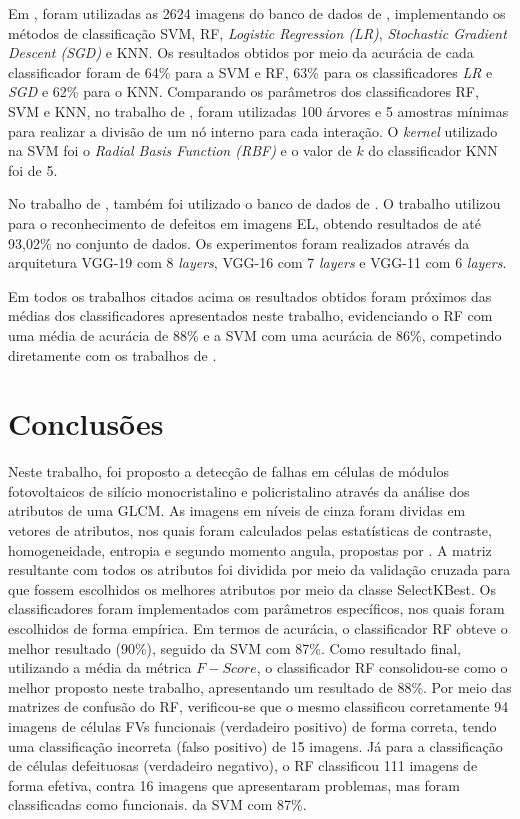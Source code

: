 \documentclass[a4paper]{ifacconf}
\begin{document}
Em \citep{Shin2020}, foram utilizadas as 2624 imagens do banco de dados de \cite{Buerhop2018}, implementando os métodos de classificação SVM, RF, \textit{Logistic Regression (LR)}, \textit{Stochastic Gradient Descent (SGD)} e KNN. Os resultados obtidos por meio da acurácia de cada classificador foram de 64\% para a SVM e RF, 63\% para os classificadores \textit{LR} e \textit{SGD} e 62\% para o KNN. Comparando os parâmetros dos classificadores RF, SVM e KNN, no trabalho de \citep{Shin2020}, foram utilizadas 100 árvores e 5 amostras mínimas para realizar a divisão de um nó interno para cada interação. O \textit{kernel} utilizado na SVM foi o \textit{Radial Basis Function (RBF)} e o valor de $k$ do classificador KNN foi de 5. 

No trabalho de \citep{Akram2019}, também foi utilizado o banco de dados de \citep{Buerhop2018}. O trabalho utilizou para o reconhecimento de defeitos em imagens EL, obtendo resultados de até 93,02\% no conjunto de dados. Os experimentos foram realizados através da arquitetura VGG-19 com 8 \textit{layers}, VGG-16 com 7 \textit{layers} e VGG-11 com 6 \textit{layers}.

Em todos os trabalhos citados acima os resultados obtidos foram próximos das médias dos classificadores apresentados neste trabalho, evidenciando o RF com uma média de acurácia de 88\% e a SVM com uma acurácia de 86\%, competindo diretamente com os trabalhos de \cite{Deitsch2019, Akram2019}. 


\section{Conclusões}
Neste trabalho, foi proposto a detecção de falhas em células de módulos fotovoltaicos de silício monocristalino e policristalino através da análise dos atributos de uma GLCM. As imagens em níveis de cinza foram dividas em vetores de atributos, nos quais
foram calculados pelas estatísticas de contraste, homogeneidade, entropia e segundo momento
angula, propostas por \citep{Haralick1973}. A matriz resultante com todos os atributos foi
dividida por meio da validação cruzada para que fossem escolhidos os melhores atributos por
meio da classe SelectKBest. Os classificadores foram implementados com parâmetros específicos,
nos quais foram escolhidos de forma empírica. Em termos de acurácia, o classificador RF obteve o melhor resultado (90\%), seguido da SVM com 87\%. Como resultado final, utilizando a média da métrica $F-Score$, o classificador RF consolidou-se como o melhor proposto neste trabalho, apresentando um resultado de 88\%. Por
meio das matrizes de confusão do RF, verificou-se que o mesmo classificou corretamente 94
imagens de células FVs funcionais (verdadeiro positivo) de forma correta, tendo uma classificação
incorreta (falso positivo) de 15 imagens. Já para a classificação de células defeituosas (verdadeiro
negativo), o RF classificou 111 imagens de forma efetiva, contra 16 imagens que apresentaram
problemas, mas foram classificadas como funcionais. 
da SVM com 87\%. 

\end{document}
